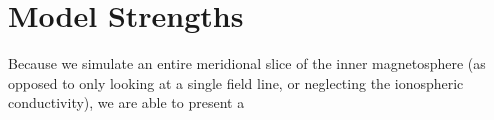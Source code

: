 \documentclass{article}
\begin{document}
\section{Model Strengths}

Because we simulate an entire meridional slice of the inner magnetosphere (as opposed to only looking at a single field line, or neglecting the ionospheric conductivity), we are able to present a 












\end{document}
